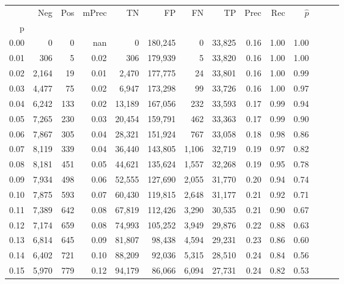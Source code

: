 \begin{tabular}{rrrrrrrrrrrrrr}
\toprule
{} &    Neg &  Pos & mPrec &       TN &       FP &      FN &      TP &  Prec &   Rec & $\hat{p}$ \\
p    &        &      &       &          &          &         &         &       &       &           \\
\midrule
0.00 &      0 &    0 &   nan &        0 &  180,245 &       0 &  33,825 &  0.16 &  1.00 &      1.00 \\
0.01 &    306 &    5 &  0.02 &      306 &  179,939 &       5 &  33,820 &  0.16 &  1.00 &      1.00 \\
0.02 &  2,164 &   19 &  0.01 &    2,470 &  177,775 &      24 &  33,801 &  0.16 &  1.00 &      0.99 \\
0.03 &  4,477 &   75 &  0.02 &    6,947 &  173,298 &      99 &  33,726 &  0.16 &  1.00 &      0.97 \\
0.04 &  6,242 &  133 &  0.02 &   13,189 &  167,056 &     232 &  33,593 &  0.17 &  0.99 &      0.94 \\
0.05 &  7,265 &  230 &  0.03 &   20,454 &  159,791 &     462 &  33,363 &  0.17 &  0.99 &      0.90 \\
0.06 &  7,867 &  305 &  0.04 &   28,321 &  151,924 &     767 &  33,058 &  0.18 &  0.98 &      0.86 \\
0.07 &  8,119 &  339 &  0.04 &   36,440 &  143,805 &   1,106 &  32,719 &  0.19 &  0.97 &      0.82 \\
0.08 &  8,181 &  451 &  0.05 &   44,621 &  135,624 &   1,557 &  32,268 &  0.19 &  0.95 &      0.78 \\
0.09 &  7,934 &  498 &  0.06 &   52,555 &  127,690 &   2,055 &  31,770 &  0.20 &  0.94 &      0.74 \\
0.10 &  7,875 &  593 &  0.07 &   60,430 &  119,815 &   2,648 &  31,177 &  0.21 &  0.92 &      0.71 \\
0.11 &  7,389 &  642 &  0.08 &   67,819 &  112,426 &   3,290 &  30,535 &  0.21 &  0.90 &      0.67 \\
0.12 &  7,174 &  659 &  0.08 &   74,993 &  105,252 &   3,949 &  29,876 &  0.22 &  0.88 &      0.63 \\
0.13 &  6,814 &  645 &  0.09 &   81,807 &   98,438 &   4,594 &  29,231 &  0.23 &  0.86 &      0.60 \\
0.14 &  6,402 &  721 &  0.10 &   88,209 &   92,036 &   5,315 &  28,510 &  0.24 &  0.84 &      0.56 \\
0.15 &  5,970 &  779 &  0.12 &   94,179 &   86,066 &   6,094 &  27,731 &  0.24 &  0.82 &      0.53 \\

\end{tabular}
